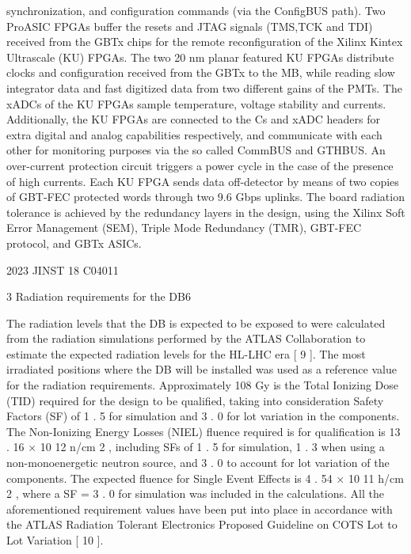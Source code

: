 \documentclass{article}
\begin{document}
synchronization, and configuration commands (via the ConfigBUS path).   Two ProASIC FPGAs 
buffer   the   resets   and   JTAG   signals   (TMS,TCK   and   TDI)   received   from   the   GBTx   chips   for   the 
remote reconfiguration of the Xilinx Kintex Ultrascale (KU) FPGAs.   The two 20 nm planar featured 
KU FPGAs distribute clocks and configuration received from the GBTx to the MB, while reading 
slow integrator data and fast digitized data from two different gains of the PMTs.   The xADCs of the 
KU FPGAs sample temperature, voltage stability and currents.   Additionally, the KU FPGAs are 
connected to the Cs and xADC headers for extra digital and analog capabilities respectively, and 
communicate with each other for monitoring purposes via the so called CommBUS and GTHBUS. 
An over-current protection circuit triggers a power cycle in the case of the presence of high currents. 
Each   KU   FPGA   sends   data   off-detector   by   means   of   two   copies   of   GBT-FEC   protected   words 
through two 9.6 Gbps uplinks.   The board radiation tolerance is achieved by the redundancy layers 
in the design, using the Xilinx Soft Error Management (SEM), Triple Mode Redundancy (TMR), 
GBT-FEC protocol, and GBTx ASICs.

2023 JINST 18 C04011

3 
Radiation requirements for the DB6

The radiation levels that the DB is expected to be exposed to were calculated from the radiation 
simulations performed by the ATLAS Collaboration to estimate the expected radiation levels for 
the HL-LHC era [ 9 ].   The most irradiated positions where the DB will be installed was used as a 
reference value for the radiation requirements.   Approximately 108 Gy is the Total Ionizing Dose 
(TID) required for the design to be qualified, taking into consideration Safety Factors (SF) of 1 . 5 for 
simulation and 3 . 0 for lot variation in the components.   The Non-Ionizing Energy Losses (NIEL) 
fluence   required   is   for   qualification   is   13 . 16  $\times$  10 12   n/cm 2 ,   including   SFs   of   1 . 5   for   simulation, 
1 . 3   when   using   a   non-monoenergetic   neutron   source,   and   3 . 0   to   account   for   lot   variation   of   the 
components.   The expected fluence for Single Event Effects is 4 . 54  $\times$  10 11   h/cm 2 , where a SF = 
3 . 0   for   simulation   was   included   in   the   calculations.   All   the   aforementioned   requirement   values 
have been put into place in accordance with the ATLAS Radiation Tolerant Electronics Proposed 
Guideline on COTS Lot to Lot Variation [ 10 ].
\end{document}

